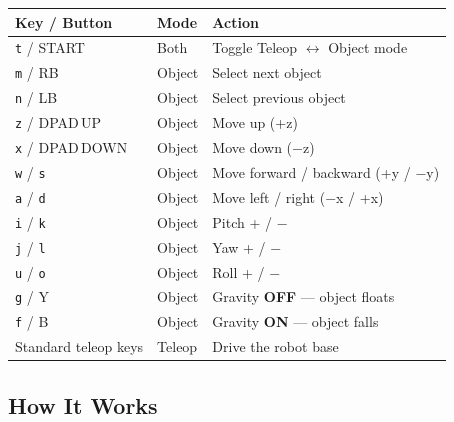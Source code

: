 \documentclass[11pt,a4paper]{article}
\begin{document}
\begin{center}
\begin{tabular}{lll}
\toprule
\textbf{Key / Button} & \textbf{Mode} & \textbf{Action} \\
\midrule
\texttt{t} / START      & Both   & Toggle Teleop $\leftrightarrow$ Object mode \\
\midrule
\texttt{m} / RB         & Object & Select next object \\
\texttt{n} / LB         & Object & Select previous object \\
\midrule
\texttt{z} / DPAD\,UP   & Object & Move up (+z) \\
\texttt{x} / DPAD\,DOWN & Object & Move down ($-$z) \\
\texttt{w} / \texttt{s} & Object & Move forward / backward (+y / $-$y) \\
\texttt{a} / \texttt{d} & Object & Move left / right ($-$x / +x) \\
\midrule
\texttt{i} / \texttt{k} & Object & Pitch + / $-$ \\
\texttt{j} / \texttt{l} & Object & Yaw + / $-$ \\
\texttt{u} / \texttt{o} & Object & Roll + / $-$ \\
\midrule
\texttt{g} / Y          & Object & Gravity \textbf{OFF} --- object floats \\
\texttt{f} / B          & Object & Gravity \textbf{ON}  --- object falls \\
\midrule
Standard teleop keys    & Teleop & Drive the robot base \\
\bottomrule
\end{tabular}
\end{center}

\subsection{How It Works}
\end{document}
